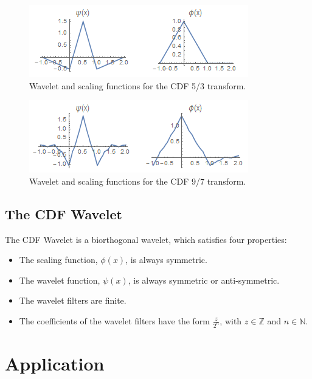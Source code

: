 \documentclass[12pt]{article}
\begin{document}
\begin{figure}[h]
	\centering
	\includegraphics[scale=0.9]{resources/lossless_family.png}
	\caption{Wavelet and scaling functions for the CDF 5/3 transform.}
	\label{fig:lossless_family}
\end{figure}

\begin{figure}[h]
	\centering
	\includegraphics[scale=0.9]{resources/lossy_family.png}
	\caption{Wavelet and scaling functions for the CDF 9/7 transform.}
	\label{fig:lossy_family}
\end{figure}

\subsection{The CDF Wavelet}

The CDF Wavelet is a biorthogonal wavelet, which satisfies four properties\cite{old}:
\begin{itemize}
	\item The scaling function, $\phi(x)$, is always symmetric.
	\item The wavelet function, $\psi(x)$, is always symmetric or anti-symmetric.
	\item The wavelet filters are finite.
	\item The coefficients of the wavelet filters have the form $\frac{z}{2^n}$, with $z\in\mathbb{Z}$ and $n\in\mathbb{N}$.
\end{itemize}



\section{Application}
\end{document}
